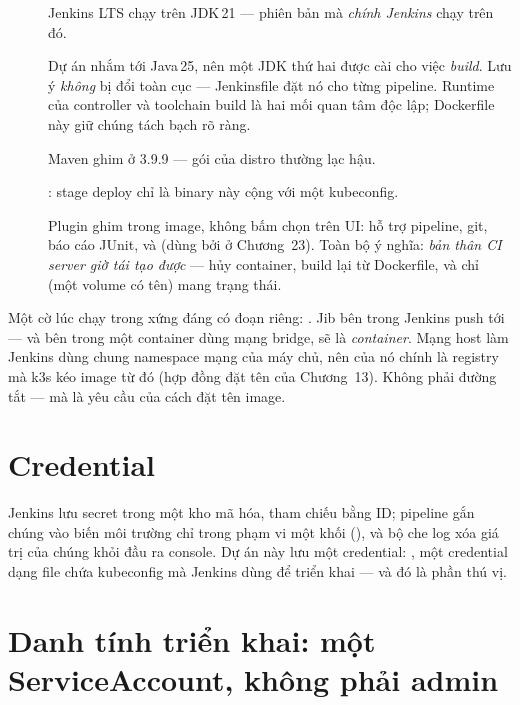 \begin{description}
  \item[] Jenkins LTS chạy trên JDK\,21 --- phiên bản mà
  \emph{chính Jenkins} chạy trên đó.
  \item[] Dự án nhắm tới Java\,25, nên một JDK thứ hai được cài
  cho việc \emph{build}. Lưu ý  \emph{không} bị đổi
  toàn cục  --- Jenkinsfile đặt nó cho từng pipeline. Runtime
  của controller và toolchain build là hai mối quan tâm độc lập;
  Dockerfile này giữ chúng tách bạch rõ ràng.
  \item[] Maven ghim ở 3.9.9 --- gói của distro thường lạc hậu.
  \item[] : stage deploy chỉ là binary này cộng
  với một kubeconfig.
  \item[] Plugin ghim trong image, không bấm chọn trên UI: hỗ
  trợ pipeline, git, báo cáo JUnit, và 
  (dùng bởi  ở Chương~23). Toàn bộ ý nghĩa:
  \emph{bản thân CI server giờ tái tạo được} --- hủy container, build
  lại từ Dockerfile, và chỉ  (một volume có tên)
  mang trạng thái.
\end{description}

Một cờ lúc chạy trong  xứng đáng có đoạn riêng:
. Jib bên trong Jenkins push tới
 --- và bên trong một container dùng mạng bridge,
 sẽ là \emph{container}. Mạng host làm Jenkins dùng
chung namespace mạng của máy chủ, nên  của nó
chính là registry mà k3s kéo image từ đó (hợp đồng đặt tên của
Chương~13). Không phải đường tắt --- mà là yêu cầu của cách đặt tên
image.

\section{Credential}

Jenkins lưu secret trong một kho mã hóa, tham chiếu bằng ID; pipeline
gắn chúng vào biến môi trường chỉ trong phạm vi một khối
(), và bộ che log xóa giá trị của chúng khỏi
đầu ra console. Dự án này lưu một credential: ,
một credential dạng file chứa kubeconfig mà Jenkins dùng để triển khai
--- và đó là phần thú vị.

\section{Danh tính triển khai: một ServiceAccount, không phải admin}


